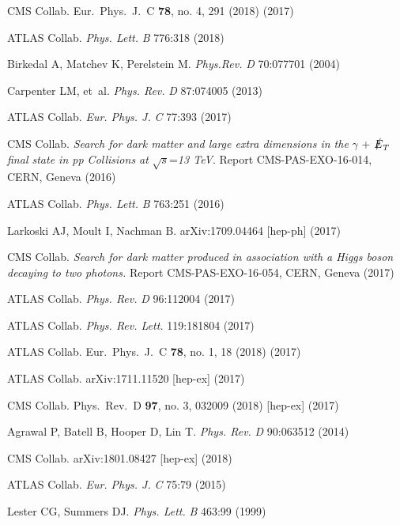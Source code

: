 \documentclass{ar-1col}
\newcommand{\MET}{\ensuremath{\slashed{E}_T}\xspace}
\begin{document}
\begin{thebibliography}{175}
{CMS Collab.} Eur.\ Phys.\ J.\ C {\bf 78}, no. 4, 291 (2018) (2017)

{ATLAS Collab.} \textit{Phys. Lett.} \textit{B} 776:318 (2018)

Birkedal A, Matchev K, Perelstein M. \textit{Phys.Rev.} \textit{D} 70:077701
(2004)

Carpenter LM, et~al. \textit{Phys. Rev.} \textit{D} 87:074005 (2013)

{ATLAS Collab.} \textit{Eur. Phys. J.} \textit{C} 77:393 (2017)

CMS Collab. \textit{Search for dark matter and large extra dimensions in the} $\gamma$ + \MET \textit{final state in pp Collisions at} $\sqrt{s}$=\textit{13 TeV}. Report CMS-PAS-EXO-16-014, CERN, Geneva (2016)

{ATLAS Collab.} \textit{Phys. Lett.} \textit{B} 763:251 (2016)

Larkoski AJ, Moult I, Nachman B. arXiv:1709.04464 [hep-ph] (2017)

CMS Collab. \textit{Search for dark matter produced in association with a Higgs boson decaying to two photons.}
Report CMS-PAS-EXO-16-054, CERN, Geneva (2017)

{ATLAS Collab.} \textit{Phys. Rev.} \textit{D} 96:112004 (2017)

{ATLAS Collab.} \textit{Phys. Rev. Lett.} 119:181804 (2017)

{ATLAS Collab.}  Eur.\ Phys.\ J.\ C {\bf 78}, no. 1, 18 (2018) (2017)

{ATLAS Collab.} arXiv:1711.11520 [hep-ex] (2017)

{CMS Collab.} Phys.\ Rev.\ D {\bf 97}, no. 3, 032009 (2018) [hep-ex] (2017)

Agrawal P, Batell B, Hooper D, Lin T. \textit{Phys. Rev.}
\textit{D} 90:063512 (2014)

{CMS Collab.} arXiv:1801.08427 [hep-ex] (2018)

{ATLAS Collab}. \textit{Eur. Phys. J.} \textit{C} 75:79 (2015)

Lester CG, Summers DJ. \textit{Phys. Lett.} \textit{B} 463:99 (1999)


\end{thebibliography}
\end{document}
